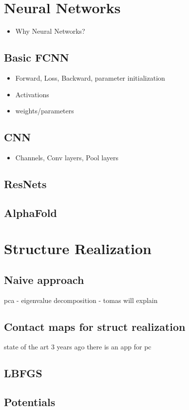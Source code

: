 \section{Neural Networks}

\begin{itemize}
    \item Why Neural Networks?
\end{itemize}

\subsection{Basic FCNN}

\begin{itemize}
    \item Forward, Loss, Backward, parameter initialization
    \item Activations
    \item weights/parameters
\end{itemize}

\subsection{CNN}

\begin{itemize}
    \item Channels, Conv layers, Pool layers
\end{itemize}

\subsection{ResNets}
    
\subsection{AlphaFold}
    
\section{Structure Realization}
\subsection{Naive approach}
pca - eigenvalue decomposition - tomas will explain
\subsection{Contact maps for struct realization}
state of the art 3 years ago
there is an app for pc
\subsection{LBFGS}
\subsection{Potentials}
